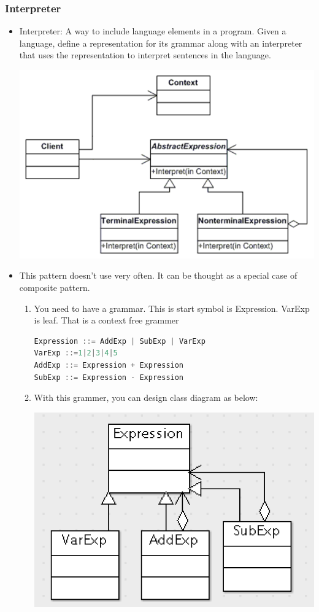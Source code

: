 \documentclass[a4paper,12pt,twoside]{book}
\begin{document}
\subsubsection{Interpreter}
\begin{itemize}
\item Interpreter: A way to include language elements in a program. Given a language, define a representation for its grammar along with an interpreter that uses the representation to interpret sentences in the language.

\includegraphics[scale=0.75]{pics/interpreter.png}

\item This pattern doesn't use very often.  It can be thought as a special case of composite pattern.
\begin{enumerate}
\item You need to have a grammar. This is start symbol is Expression. VarExp is leaf. That is a context free grammer
\begin{lstlisting}[frame=single, language=c++]
Expression ::= AddExp | SubExp | VarExp
VarExp ::=1|2|3|4|5
AddExp ::= Expression + Expression
SubExp ::= Expression - Expression
\end{lstlisting}

\item With this grammer, you can design class diagram as below: 

\includegraphics[scale=0.75]{pics/exp.png}


\end{enumerate}
\end{itemize}
\end{document}
